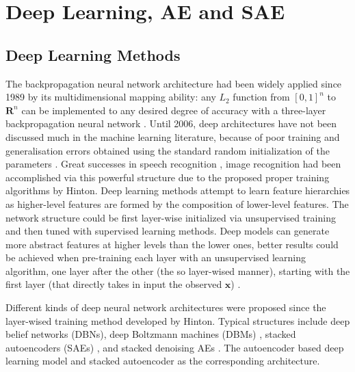 \documentclass{bmcart}
\begin{document}
 

  

\section*{Deep Learning, AE and SAE}
\subsection*{Deep Learning Methods}
The backpropagation neural network architecture had been widely applied since 1989 by its multidimensional mapping ability: any $L_2$ function from $[0, 1]^n$ to $\mathbf{R}^n$ can be implemented to any desired degree of accuracy with a three-layer backpropagation neural network \cite{hecht}. Until 2006, deep architectures have not been discussed much in the machine learning literature, because of poor training and generalisation errors obtained using the standard random initialization of the parameters \cite{bengio2009}. Great successes in speech recognition \cite{hinton2012deep}, image recognition\cite{ciresan2010deep} had been accomplished via this powerful structure due to the proposed proper training algorithms by Hinton\cite{hinton}. Deep learning methods attempt to learn feature hierarchies as higher-level features are formed by the composition of lower-level features. The network structure could be first layer-wise initialized via unsupervised training and then tuned with supervised learning methods. Deep models can generate more abstract features at higher levels than the lower ones,  better results could be achieved when pre-training each layer with an unsupervised learning algorithm, one layer after the other (the so layer-wised manner), starting with the first layer (that directly takes in input the observed $\mathbf{x}$) \cite{bengio2009}.

Different kinds of deep neural network architectures were proposed since the layer-wised training method developed by Hinton. Typical structures include deep belief networks (DBNs)\cite{hinton2006fast}, deep Boltzmann machines (DBMs) \cite{salakhutdinov2009deep}, stacked autoencoders (SAEs) \cite{bengio2007greedy}, and stacked denoising AEs \cite{vincent2010stacked}. The autoencoder based deep learning model and stacked autoencoder as the corresponding architecture.
 
\end{document}
